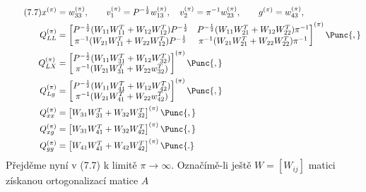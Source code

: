\begin{align*}
  \tag{7.7}
  x^{(\pi)} &= w_{33}^{(\pi)}, \qquad v_1^{(\pi)} = P^{-{1\over2}} w_{13}^{(\pi)},
  \quad v_2^{(\pi)} = \pi^{-1} w_{23}^{(\pi)},\qquad g^{(\pi)} = w_{43}^{(\pi)},\\
  Q_{LL}^{(\pi)} &=
  \begin{bmatrix}
    P^{-{1\over2}}(W_{11}W_{11}^T + W_{12}W_{12}^T)P^{-{1\over2}} &
    P^{-{1\over2}}(W_{11}W_{21}^T + W_{12}W_{22}^T) \pi^{-1}\\
    \pi^{-1}(W_{21}W_{11}^T + W_{22}W_{12}^T)P^{-{1\over2}} &
    \pi^{-1}(W_{21}W_{21}^T + W_{22}W_{22}^T)\pi^{-1}\\
  \end{bmatrix}^{(\pi)} \Punc{,} \\
  Q_{LX}^{(\pi)} &=
  \begin{bmatrix}
    P^{-{1\over2}}(W_{11}W_{31}^T + W_{12}W_{32}^T)\\
    \pi^{-1}(W_{21}W_{31}^T + W_{22}w_{32}^T) \\
  \end{bmatrix}^{(\pi)} \Punc{,} \\
  Q_{Lg}^{(\pi)} &=
  \begin{bmatrix}
    P^{-{1\over2}}(W_{11}W_{41}^T + W_{12}W_{42}^T)\\
    \pi^{-1}(W_{21}W_{41}^T + W_{22}w_{42}^T) \\
  \end{bmatrix}^{(\pi)} \Punc{,} \\
  Q_{xx}^{(\pi)} &=
  \begin{bmatrix}
    W_{31}W_{31}^T + W_{32}W_{32}^T
  \end{bmatrix}^{(\pi)} \Punc{,} \\
  Q_{xg}^{(\pi)} &=
  \begin{bmatrix}
    W_{31}W_{41}^T + W_{32}W_{42}^T
  \end{bmatrix}^{(\pi)} \Punc{,} \\
  Q_{gg}^{(\pi)} &=
  \begin{bmatrix}
    W_{41}W_{41}^T + W_{42}W_{42}^T
  \end{bmatrix}^{(\pi)} \Punc{.} \\
\end{align*}
%
Přejděme nyní v  (7.7) k limitě $\pi \rightarrow \infty$. Označímě-li
ještě $W = [ W_{ij} ]$ matici získanou ortogonalizací matice $A$
%
